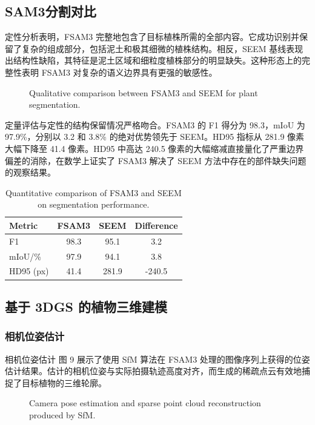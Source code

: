 \documentclass[preprint,12pt]{elsarticle}
\begin{document}
\subsection{SAM3分割对比}

定性分析表明，FSAM3 完整地包含了目标植株所需的全部内容。它成功识别并保留了复杂的组成部分，包括泥土和极其细微的植株结构。相反，SEEM 基线表现出结构性缺陷，其特征是泥土区域和细粒度植株部分的明显缺失。这种形态上的完整性表明 FSAM3 对复杂的语义边界具有更强的敏感性。

\begin{figure}[t]
\centering
\caption{Qualitative comparison between FSAM3 and SEEM for plant segmentation.}
\label{fig:image15}
\end{figure}

定量评估与定性的结构保留情况严格吻合。FSAM3 的 F1 得分为 98.3，mIoU 为 97.9\%，分别以 3.2 和 3.8\% 的绝对优势领先于 SEEM。HD95 指标从 281.9 像素大幅下降至 41.4 像素。HD95 中高达 240.5 像素的大幅缩减直接量化了严重边界偏差的消除，在数学上证实了 FSAM3 解决了 SEEM 方法中存在的部件缺失问题的观察结果。

\begin{table}[t]
\centering
\caption{Quantitative comparison of FSAM3 and SEEM on segmentation performance.}
\label{tab:1}
\begin{tabular}{lccc}
\toprule
Metric & FSAM3 & SEEM & Difference \\
\midrule
F1 & 98.3 & 95.1 & 3.2 \\
mIoU/\% & 97.9 & 94.1 & 3.8 \\
HD95 (px) & 41.4 & 281.9 & -240.5 \\
\bottomrule
\end{tabular}
\end{table}

\subsection{基于 3DGS 的植物三维建模}

\subsubsection{相机位姿估计}

相机位姿估计 图 9 展示了使用 SfM 算法在 FSAM3 处理的图像序列上获得的位姿估计结果。估计的相机位姿与实际拍摄轨迹高度对齐，而生成的稀疏点云有效地捕捉了目标植物的三维轮廓。

\begin{figure}[t]
\centering
\caption{Camera pose estimation and sparse point cloud reconstruction produced by SfM.}
\label{fig:image17}
\end{figure}
\end{document}
